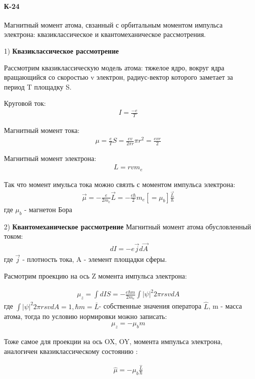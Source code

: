 \documentclass[__main__.tex]{subfiles}
\begin{document}
\paragraph{К-24}
Магнитный момент атома, свзанный с орбитальным моментом импульса электрона: квазиклассическое и квантомеханическое рассмотрения.

1) \textbf{Квазиклассическое рассмотрение}

Рассмотрим квазиклассическую модель атома: тяжелое ядро, вокруг ядра вращающийся со скоростью v электрон, радиус-вектор которого заметает за период T площадку S. 

Круговой ток:
\begin{gather}
\label{K24/1}
I=\frac{-e}{T} 
\end{gather}

Магнитный момент тока:
\begin{gather}
\label{K24/2}
 \mu=\frac{e}{T}S=\frac{ev}{2\pi r}\pi r^{2}= \frac{evr}{2} 
\end{gather}

Магнитный момент электрона:
\begin{gather}
\label{K24/3}
 L= r v m_{e} 
\end{gather}

Так что момент имульса тока можно связть с моментом импульса электрона:
\begin{gather}
\label{K24/4}
 \vec{\mu}= -\frac{e}{2m_{e}}\vec{L}= -\frac{e\hbar}{2} m_{e}[=\mu_{b}]\frac{\vec{L}}{\hbar} 
\end{gather}
 где $\mu_{b}$ - магнетон Бора
 
 2) \textbf{Квантомеханическое рассмотрение}
 Магнитный момент атома обусловленный током:
 \begin{gather}
 \label{K24/5}
  \ dI=-e\vec{j}d\vec{A}
 \end{gather}
 где $\vec{j}$ - плотность тока, A - элемент площадки сферы.
 
 Расмотрим проекцию на ось Z момента импульса электрона:
 
 \begin{gather}
 \label{K24/6}
 \mu_{z}=\int dI S= -\frac{e\hbar m}{2m_e} \int |\psi|^2 2 \pi r s v dA 
 \end{gather}
  где  $\int |\psi|^2 2 \pi r s v dA=1, \hbar m = \bar{L}$- собственные значения оператора $\hat{L}$,  m - масса атома, тогда  по условию нормировки
   можно записать:
   \begin{gather}
  \label{K24/7}
 \mu_{z} = -\mu_{b}m 
  \end{gather}
  
  Тоже самое для проекции на ось OX, OY,  момента импульса электрона, аналогичен квазиклассическому состоянию  :
  
  \begin{gather}
  \label{K24/8}
  \hat{\mu}=-\mu_{b}\frac{\hat{L}}{\hbar}
  \end{gather}
\end{document}

